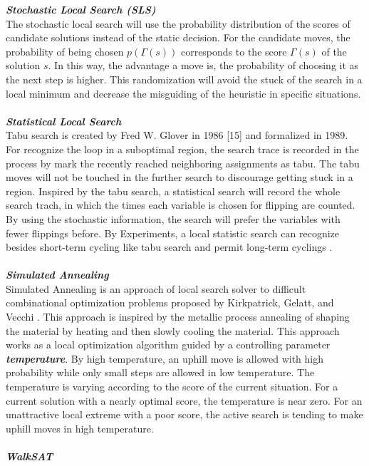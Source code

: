 \documentclass[12pt,a4paper,twoside]{scrartcl}
\numberwithin{equation}{section}
\begin{document}
\emph{\textbf{Stochastic Local Search (SLS)}}\\
The stochastic local search will use the probability distribution of the scores of candidate solutions instead of the static decision. For the candidate moves, the probability of being chosen $p(\Gamma(s))$ corresponds to the score $\Gamma(s)$ of the solution $s$. In this way, the advantage a move is, the probability of choosing it as the next step is higher. This randomization will avoid the stuck of the search in a local minimum and decrease the misguiding of the heuristic in specific situations. \\
\\
\emph{\textbf{Statistical Local Search }}\\
 Tabu search is created by Fred W. Glover in 1986 [15] and formalized in 1989.  For recognize the loop in a suboptimal region, the search trace is recorded in the process by mark the recently reached neighboring assignments as tabu. The tabu moves will not be touched in the further search to discourage getting stuck in a region. Inspired by the tabu search, a statistical search will record the whole search trach, in which the times each variable is chosen for flipping are counted. By using the stochastic information, the search will prefer the variables with fewer flippings before. By Experiments, a local statistic search can recognize besides short-term cycling like tabu search and permit long-term cyclings \cite{lisolving}.\\
\\
\emph{\textbf{Simulated Annealing}}\\
Simulated Annealing is an approach of local search solver to difficult combinational optimization problems proposed by Kirkpatrick, Gelatt, and Vecchi \cite{kirkpatrick1983optimization}. This approach is inspired by the metallic process annealing of shaping the material by heating and then slowly cooling the material. This approach works as a local optimization algorithm guided by a controlling parameter \emph{\textbf{temperature}}. By high temperature, an uphill move is allowed with high probability while only small steps are allowed in low temperature. The temperature is varying according to the score of the current situation.  For a current solution with a nearly optimal score, the temperature is near zero. For an unattractive local extreme with a poor score, the active search is tending to make uphill moves in high temperature.\\
\\
\emph{\textbf{WalkSAT}}\\
\end{document}
